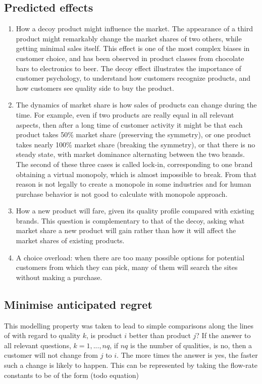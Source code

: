 \subsection{Predicted effects} \label{subsec:predicted}
\begin{enumerate}
	\item How a decoy product might influence the market.
	The appearance of a third product might remarkably change the market shares of two others, while getting minimal sales itself.
	This effect is one of the most complex biases in customer choice, and has been observed in product classes from chocolate bars to electronics to beer.
	The decoy effect illustrates the importance of customer psychology, to understand how customers recognize products, and how customers see quality side to buy the product.

	\item The dynamics of market share is how sales of products can change during the time.
	For example, even if two products are really equal in all relevant aspects, then after a long time of customer
	activity it might be that each product takes 50\% market share (preserving the symmetry), or one product takes
	nearly 100\% market share (breaking the symmetry), or that there is no steady state, with market dominance alternating between the two brands.
	The second of these three cases is called lock-in, corresponding to one brand obtaining a virtual monopoly, which is almost impossible to break.
	From that reason is not legally to create a monopole in some industries and for human purchase behavior is not good to calculate with monopole approach.

	\item How a new product will fare, given its quality profile compared with existing brands.
	This question is complementary to that of the decoy, asking what market share a new product will gain rather than how it will affect the market shares of existing products.

	\item A choice overload: when there are too many possible options for potential customers from which they can pick,
	many of them will search the sites without making a purchase.
\end{enumerate}

\subsection{Minimise anticipated regret} \label{subsec:regret}
This modelling property was taken to lead to simple comparisons along the lines of with regard to quality $k$,
is product $i$ better than product $j$?
If the answer to all relevant questions, $k = 1, . . . , nq$, if $nq$ is the number of qualities, is no, then a customer
will not change from $j$ to $i$.
The more times the answer is yes, the faster such a change is likely to happen.
This can be represented by taking the flow-rate constants to be of the form (todo equation)

